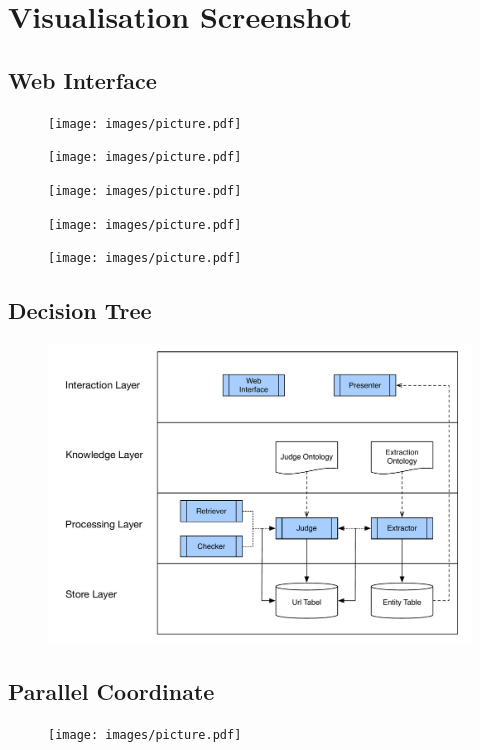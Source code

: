 \chapter{Visualisation Screenshot}
\section{Web Interface}\label{apdx:ui}
\begin{figure}[H]
	\centering
	\texttt{[image: images/picture.pdf]}
\end{figure}
\begin{figure}[H]
	\centering
	\texttt{[image: images/picture.pdf]}
\end{figure}
\vspace{-3em}
\begin{figure}[H]
	\centering
	\texttt{[image: images/picture.pdf]}
\end{figure}

\begin{figure}[H]
	\centering
	\texttt{[image: images/picture.pdf]}
\end{figure}
\vspace{-3em}
\begin{figure}[H]
	\centering
	\texttt{[image: images/picture.pdf]}
\end{figure}

\section{Decision Tree}\label{apdx:dtree}
\vspace{-1.8em}
\begin{figure}[H]
	\centering
	\includegraphics[page=13,width=\textwidth]{images/diagrams.pdf}
\end{figure}

\section{Parallel Coordinate}\label{apdx:pd}
\vspace{-1.5em}
\begin{figure}[H]
	\centering
	\texttt{[image: images/picture.pdf]}
\end{figure}

\restoregeometry

